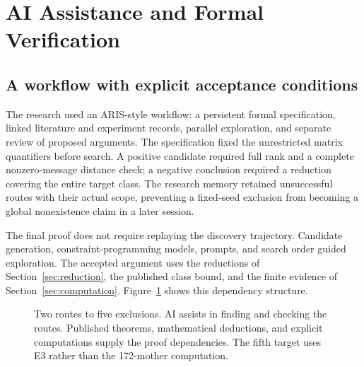 \section{AI Assistance and Formal Verification}
\label{sec:ai}
\subsection{A workflow with explicit acceptance conditions}
The research used an ARIS-style workflow: a persistent formal specification, linked literature and experiment records, parallel exploration, and separate review of proposed arguments. The specification fixed the unrestricted matrix quantifiers before search. A positive candidate required full rank and a complete nonzero-message distance check; a negative conclusion required a reduction covering the entire target class. The research memory retained unsuccessful routes with their actual scope, preventing a fixed-seed exclusion from becoming a global nonexistence claim in a later session.

The final proof does not require replaying the discovery trajectory. Candidate generation, constraint-programming models, prompts, and search order guided exploration. The accepted argument uses the reductions of Section~\ref{sec:reduction}, the published class bound, and the finite evidence of Section~\ref{sec:computation}. Figure~\ref{fig:flow} shows this dependency structure.

\begin{figure}[t]
\centering
{}
\caption{Two routes to five exclusions. AI assists in finding and checking the routes. Published theorems, mathematical deductions, and explicit computations supply the proof dependencies. The fifth target uses E3 rather than the 172-mother computation.}
\label{fig:flow}
\end{figure}

